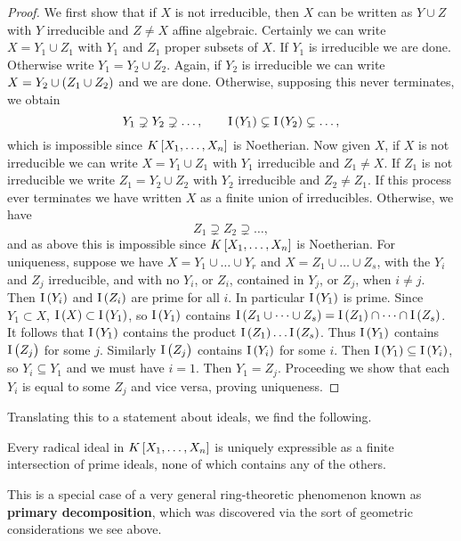 \begin{proof}
We first show that if $ X $ is not irreducible, then $ X $ can be written as $ Y \cup Z $ with $ Y $ irreducible and $ Z \ne X $ affine algebraic. Certainly we can write $ X = Y_1 \cup Z_1 $ with $ Y_1 $ and $ Z_1 $ proper subsets of $ X $. If $ Y_1 $ is irreducible we are done. Otherwise write $ Y_1 = Y_2 \cup Z_2 $. Again, if $ Y_2 $ is irreducible we can write $ X = Y_2 \cup \br{Z_1 \cup Z_2} $ and we are done. Otherwise, supposing this never terminates, we obtain
$$ Y_1 \supsetneq Y_2 \supsetneq \dots, \qquad \I\br{Y_1} \subsetneq \I\br{Y_2} \subsetneq \dots, $$
which is impossible since $ K\sbr{X_1, \dots, X_n} $ is Noetherian. Now given $ X $, if $ X $ is not irreducible we can write $ X = Y_1 \cup Z_1 $ with $ Y_1 $ irreducible and $ Z_1 \ne X $. If $ Z_1 $ is not irreducible we write $ Z_1 = Y_2 \cup Z_2 $ with $ Y_2 $ irreducible and $ Z_2 \ne Z_1 $. If this process ever terminates we have written $ X $ as a finite union of irreducibles. Otherwise, we have
$$ Z_1 \supsetneq Z_2 \supsetneq \dots, $$
and as above this is impossible since $ K\sbr{X_1, \dots, X_n} $ is Noetherian. For uniqueness, suppose we have $ X = Y_1 \cup \dots \cup Y_r $ and $ X = Z_1 \cup \dots \cup Z_s $, with the $ Y_i $ and $ Z_j $ irreducible, and with no $ Y_i $, or $ Z_i $, contained in $ Y_j $, or $ Z_j $, when $ i \ne j $. Then $ \I\br{Y_i} $ and $ \I\br{Z_i} $ are prime for all $ i $. In particular $ \I\br{Y_1} $ is prime. Since $ Y_1 \subset X $, $ \I\br{X} \subset \I\br{Y_1} $, so $ \I\br{Y_1} $ contains $ \I\br{Z_1 \cup \dots \cup Z_s} = \I\br{Z_1} \cap \dots \cap \I\br{Z_s} $. It follows that $ \I\br{Y_1} $ contains the product $ \I\br{Z_1} \dots \I\br{Z_s} $. Thus $ \I\br{Y_1} $ contains $ \I\br{Z_j} $ for some $ j $. Similarly $ \I\br{Z_j} $ contains $ \I\br{Y_i} $ for some $ i $. Then $ \I\br{Y_1} \subseteq \I\br{Y_i} $, so $ Y_i \subseteq Y_1 $ and we must have $ i = 1 $. Then $ Y_1 = Z_j $. Proceeding we show that each $ Y_i $ is equal to some $ Z_j $ and vice versa, proving uniqueness.
\end{proof}

Translating this to a statement about ideals, we find the following.

\begin{corollary}
Every radical ideal in $ K\sbr{X_1, \dots, X_n} $ is uniquely expressible as a finite intersection of prime ideals, none of which contains any of the others.
\end{corollary}

This is a special case of a very general ring-theoretic phenomenon known as \textbf{primary decomposition}, which was discovered via the sort of geometric considerations we see above.

